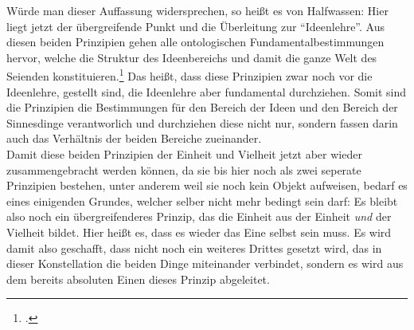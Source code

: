 Würde man dieser Auffassung widersprechen, so heißt es von Halfwassen:
Hier liegt jetzt der übergreifende Punkt und die Überleitung zur \enquote{Ideenlehre}. Aus diesen beiden Prinzipien gehen alle ontologischen Fundamentalbestimmungen hervor, welche die Struktur des Ideenbereichs und damit die ganze Welt des Seienden konstituieren.\footcite[vgl.][S. 104]{halfwassen2015spuren} Das heißt, dass diese Prinzipien zwar noch vor die Ideenlehre, gestellt sind, die Ideenlehre aber fundamental durchziehen. Somit sind die Prinzipien die Bestimmungen für den Bereich der Ideen und den Bereich der Sinnesdinge verantworlich und durchziehen diese nicht nur, sondern fassen darin auch das Verhältnis der beiden Bereiche zueinander.\\
Damit diese beiden Prinzipien der Einheit und Vielheit jetzt aber wieder zusammengebracht werden können, da sie bis hier noch als zwei seperate Prinzipien bestehen, unter anderem weil sie noch kein Objekt aufweisen, bedarf es eines einigenden Grundes, welcher selber nicht mehr bedingt sein darf:
Es bleibt also noch ein übergreifenderes Prinzip, das die Einheit aus der Einheit \emph{und} der Vielheit bildet. Hier heißt es, dass es wieder das Eine selbst sein muss. Es wird damit also geschafft, dass nicht noch ein weiteres Drittes gesetzt wird, das in dieser Konstellation die beiden Dinge miteinander verbindet, sondern es wird aus dem bereits absoluten Einen dieses Prinzip abgeleitet. 
